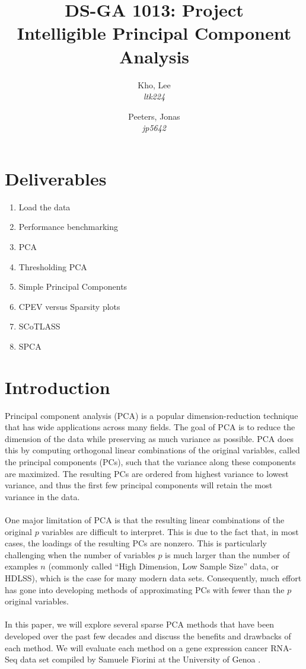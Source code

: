 \documentclass[10pt,letterpaper]{article}
\author{
	Kho, Lee\\
	\textit{ltk224}
	\and
	Peeters, Jonas\\
	\textit{jp5642}
}
\title{DS-GA 1013: Project\\Intelligible Principal Component Analysis}
\begin{document}
\maketitle
\section*{Deliverables}
\begin{enumerate}
\item Load the data
\item Performance benchmarking
\item PCA
\item Thresholding PCA
\item Simple Principal Components
\item CPEV versus Sparsity plots
\item SCoTLASS
\item SPCA
\end{enumerate}

\section*{Introduction}

Principal component analysis (PCA) is a popular dimension-reduction technique that has wide applications across many fields. The goal of PCA is to reduce the dimension of the data while preserving as much variance as possible. PCA does this by computing orthogonal linear combinations of the original variables, called the principal components (PCs), such that the variance along these components are maximized.  The resulting PCs are ordered from highest variance to lowest variance, and thus the first few principal components will retain the most variance in the data.\\
\\
One major limitation of PCA is that the resulting linear combinations of the original $p$ variables are difficult to interpret. This is due to the fact that, in most cases, the loadings of the resulting PCs are nonzero. This is particularly challenging when the number of variables $p$ is much larger than the number of examples $n$ (commonly called “High Dimension, Low Sample Size” data, or HDLSS), which is the case for many modern data sets. Consequently, much effort has gone into developing methods of approximating PCs with fewer than the $p$ original variables.\\
\\
In this paper, we will explore several sparse PCA methods that have been developed over the past few decades and discuss the benefits and drawbacks of each method. We will evaluate each method on a gene expression cancer RNA-Seq data set compiled by Samuele Fiorini at the University of Genoa \cite{Dua2019}.\\
\\
\end{document}
